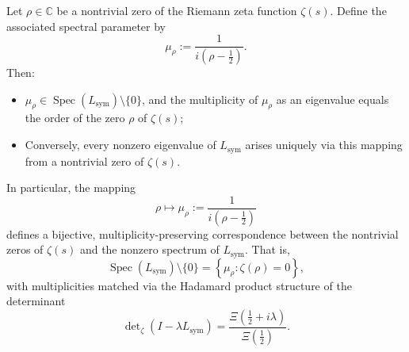 \begin{lemma}
\label{lem:spectral-zero-encoding}
Let \( \rho \in \mathbb{C} \) be a nontrivial zero of the Riemann zeta function \( \zeta(s) \). Define the associated spectral parameter by
\[
\mu_\rho := \frac{1}{i(\rho - \tfrac{1}{2})}.
\]
Then:
\begin{itemize}
  \item \( \mu_\rho \in \operatorname{Spec}(L_{\mathrm{sym}}) \setminus \{0\} \), and the multiplicity of \( \mu_\rho \) as an eigenvalue equals the order of the zero \( \rho \) of \( \zeta(s) \);
  \item Conversely, every nonzero eigenvalue of \( L_{\mathrm{sym}} \) arises uniquely via this mapping from a nontrivial zero of \( \zeta(s) \).
\end{itemize}

\medskip
\noindent
In particular, the mapping
\[
\rho \mapsto \mu_\rho := \frac{1}{i(\rho - \tfrac{1}{2})}
\]
defines a bijective, multiplicity-preserving correspondence between the nontrivial zeros of \( \zeta(s) \) and the nonzero spectrum of \( L_{\mathrm{sym}} \). That is,
\[
\operatorname{Spec}(L_{\mathrm{sym}}) \setminus \{0\} = \left\{ \mu_\rho : \zeta(\rho) = 0 \right\},
\]
with multiplicities matched via the Hadamard product structure of the determinant
\[
\det\nolimits_\zeta(I - \lambda L_{\mathrm{sym}}) = \frac{\Xi\left(\tfrac{1}{2} + i\lambda\right)}{\Xi\left(\tfrac{1}{2}\right)}.
\]
\end{lemma}
